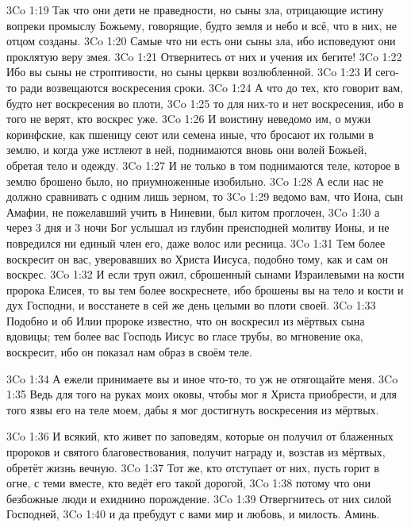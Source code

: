 \vs 3Co 1:19
Так что они дети не праведности, но сыны зла,
отрицающие истину вопреки промыслу Божьему,
говорящие, будто земля и небо и всё,
что в них, не отцом созданы.
\vs 3Co 1:20
Самые что ни есть они сыны зла,
ибо исповедуют они проклятую веру змея.
\vs 3Co 1:21
Отвернитесь от них и учения их бегите!
\vs 3Co 1:22
Ибо вы сыны не строптивости,
но сыны церкви возлюбленной.
\vs 3Co 1:23
И сего-то ради возвещаются воскресения сроки.
\vs 3Co 1:24
А что до тех, кто говорит вам,
будто нет воскресения во плоти,
\vs 3Co 1:25
то для них-то и нет воскресения,
ибо в того не верят, кто воскрес уже.
\vs 3Co 1:26
И воистину неведомо им,
о мужи коринфские, как пшеницу сеют или семена иные,
что бросают их голыми в землю, и когда уже истлеют в ней,
поднимаются вновь они волей Божьей, обретая тело и одежду.
\vs 3Co 1:27
И не только в том поднимаются теле,
которое в землю брошено было,
но приумноженные изобильно.
\vs 3Co 1:28
А если нас не должно сравнивать с одним лишь зерном, то
\vs 3Co 1:29
ведомо вам, что Иона,
сын Амафии, не пожелавший учить в Ниневии,
был китом проглочен,
\vs 3Co 1:30
а через 3 дня и 3 ночи Бог услышал из глубин
преисподней молитву Ионы, и не повредился ни единый
член его, даже волос или ресница.
\vs 3Co 1:31
Тем более воскресит он вас,
уверовавших во Христа Иисуса,
подобно тому, как и сам он воскрес.
\vs 3Co 1:32
И если труп ожил, сброшенный сынами Израилевыми
на кости пророка Елисея, то вы тем более воскреснете,
ибо брошены вы на тело и кости и дух Господни,
и восстанете в сей же день целыми во плоти своей.
\vs 3Co 1:33
Подобно и об Илии пророке известно,
что он воскресил из мёртвых сына вдовицы;
тем более вас Господь Иисус во гласе трубы,
во мгновение ока, воскресит,
ибо он показал нам образ в своём теле.

\vs 3Co 1:34
А ежели принимаете вы и иное что-то,
то уж не отягощайте меня.
\vs 3Co 1:35
Ведь для того на руках моих оковы,
чтобы мог я Христа приобрести,
и для того язвы его на теле моем,
дабы я мог достигнуть воскресения из мёртвых.

\vs 3Co 1:36
И всякий, кто живет по заповедям,
которые он получил от блаженных пророков
и святого благовествования, получит награду и,
возстав из мёртвых, обретёт жизнь вечную.
\vs 3Co 1:37
Тот же, кто отступает от них,
пусть горит в огне, с теми вместе,
кто ведёт его такой дорогой,
\vs 3Co 1:38
потому что они безбожные люди и ехиднино порождение.
\vs 3Co 1:39
Отвергнитесь от них силой Господней,
\vs 3Co 1:40
и да пребудут с вами мир и любовь, и милость. Аминь.
